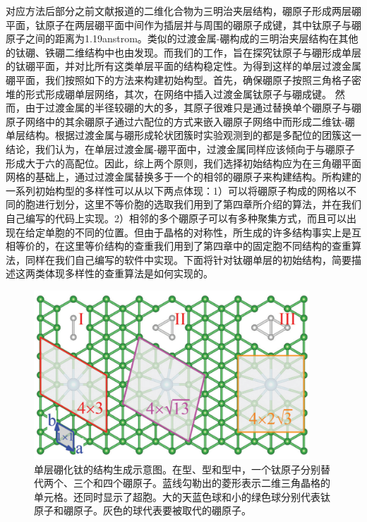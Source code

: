 对应方法后部分之前文献报道的二维化合物为三明治夹层结构，硼原子形成两层硼平面，钛原子在两层硼平面中间作为插层并与周围的硼原子成键，其中钛原子与硼原子之间的距离为\num{1.19}\si{anstrom}。类似的过渡金属-硼构成的三明治夹层结构在其他的钛硼、铁硼二维结构中也由发现。而我们的工作，旨在探究钛原子与硼形成单层的钛硼平面，并对比所有这类单层平面的结构稳定性。为得到这样的单层过渡金属硼平面，我们按照如下的方法来构建初始构型。首先，确保硼原子按照三角格子密堆的形式形成硼单层网络，其次，在网络中插入过渡金属钛原子与硼成键。
然而，由于过渡金属的半径较硼的大的多，其原子很难只是通过替换单个硼原子与硼原子网络中的其余硼原子通过六配位的方式来嵌入硼原子网络中而形成二维钛-硼单层结构。根据过渡金属与硼形成轮状团簇时实验观测到的都是多配位的团簇这一结论，我们认为，在单层过渡金属-硼平面中，过渡金属同样应该倾向于与硼原子形成大于六的高配位。因此，综上两个原则，我们选择初始结构应为在三角硼平面网格的基础上，通过过渡金属替换多于一个的相邻的硼原子来构建结构。所构建的一系列初始构型的多样性可以从以下两点体现：1）可以将硼原子构成的网格以不同的胞进行划分，这里不等价胞的选取我们用到了第四章所介绍的算法，并在我们自己编写的代码上实现。2）相邻的多个硼原子可以有多种聚集方式，而且可以出现在给定单胞的不同的位置。但由于晶格的对称性，所生成的许多结构事实上是互相等价的，在这里等价结构的查重我们用到了第四章中的固定胞不同结构的查重算法，同样在我们自己编写的软件中实现。下面将针对钛硼单层的初始结构，简要描述这两类体现多样性的查重算法是如何实现的。

\begin{figure}
  \includegraphics[width=0.92\textwidth]{figs/ch5_how_cell_choose.png}
  \centering
  \caption{单层硼化钛的结构生成示意图。在型、型和型中，一个钛原子分别替代两个、三个和四个硼原子。蓝线勾勒出的菱形表示二维三角晶格的单元格。还同时显示了超胞。大的天蓝色球和小的绿色球分别代表钛原子和硼原子。灰色的球代表要被取代的硼原子。}
  \label{fig:ch5_how_cell_choose}
\end{figure}

